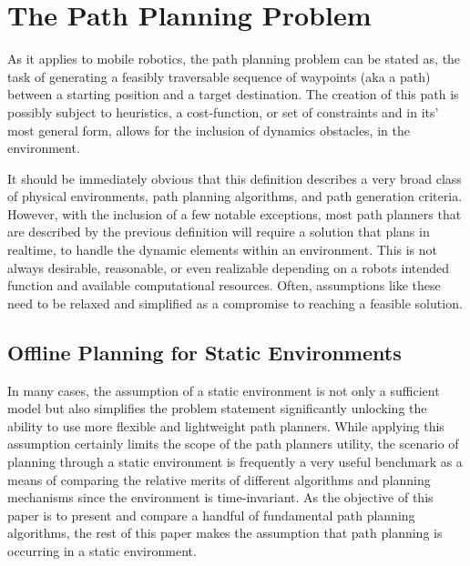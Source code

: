 \section{The Path Planning Problem} 

As it applies to mobile robotics, the path planning problem can be stated as, the task of generating a feasibly traversable sequence of waypoints (aka a path) between a starting position and a target destination. The creation of this path is possibly subject to heuristics, a cost-function, or set of constraints and in its' most general form, allows for the inclusion of dynamics obstacles, in the environment. 

It should be immediately obvious that this definition describes a very broad class of physical environments, path planning algorithms, and path generation criteria. However, with the inclusion of a few notable exceptions, most path planners that are described by the previous definition will require a solution that plans in realtime, to handle the dynamic elements within an environment. This is not always desirable, reasonable, or even realizable depending on a robots intended function and available computational resources. Often, assumptions like these need to be relaxed and simplified as a compromise to reaching a feasible solution.

\subsection{Offline Planning for Static Environments}

In many cases, the assumption of a static environment is not only a sufficient model but also simplifies the problem statement significantly unlocking the ability to use more flexible and lightweight path planners. While applying this assumption certainly limits the scope of the path planners utility, the scenario of planning through a static environment is frequently a very useful benchmark as a means of comparing the relative merits of different algorithms and planning mechanisms since the environment is time-invariant. As the objective of this paper is to present and compare a handful of fundamental path planning algorithms, the rest of this paper makes the assumption that path planning is occurring in a static environment.